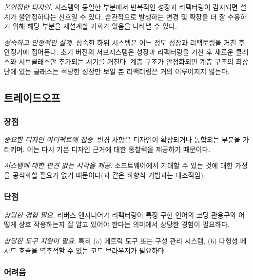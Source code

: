 \documentclass[a4paper,10pt,twoside]{book}
\begin{document}
\noindent
\emph{불안정한 디자인.}
시스템의 동일한 부분에서 반복적인 성장과 리팩터링이 감지되면 설계가 불안정하다는 신호일 수 있다. 습관적으로 발생하는 변경 및 확장을 더 잘 수용하기 위해 해당 부분을 재설계할 기회가 있음을 나타낼 수 있다.

\noindent
\emph{성숙하고 안정적인 설계.}
성숙한 하위 시스템은 어느 정도 성장과 리팩토링을 거친 후 안정기에 접어든다. 초기 버전의 서브시스템은 성장과 리팩터링을 거친 후 새로운 클래스와 서브클래스만 추가되는 시기를 거친다. 계층 구조가 안정화되면 계층 구조의 최상단에 있는 클래스는 적당한 성장만 보일 뿐 리팩터링은 거의 이루어지지 않는다.

\subsection*{트레이드오프}

\subsubsection*{장점}

\begin{bulletlist}
\item \emph{중요한 디자인 아티팩트에 집중.}
변경 사항은 디자인이 확장되거나 통합되는 부분을 가리키며, 이는 다시 기본 디자인 근거에 대한 통찰력을 제공하기 때문이다.

\item \emph{시스템에 대한 편견 없는 시각을 제공.}
소프트웨어에서 기대할 수 있는 것에 대한 가정을 공식화할 필요가 없기 때문이다(과 같은 하향식 기법과는 대조적임).
\end{bulletlist}

\subsubsection*{단점}

\begin{bulletlist}
\item \emph{상당한 경험 필요.}
리버스 엔지니어가 리팩터링이 특정 구현 언어의 코딩 관용구와 어떻게 상호 작용하는지 잘 알고 있어야 한다는 의미에서 상당한 경험이 필요하다.

\item \emph{상당한 도구 지원이 필요.}
특히 (a) 메트릭 도구 또는 구성 관리 시스템, (b) 다형성 메서드 호출을 역추적할 수 있는 코드 브라우저가 필요하다.
\end{bulletlist}

\subsubsection*{어려움}
\end{document}
